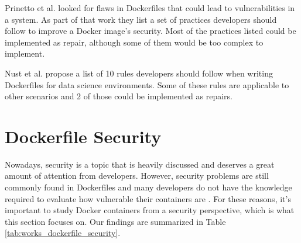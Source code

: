 Prinetto et al. \cite{prinettoSecurityMisconfigurationsDetection} looked for flaws in Dockerfiles that could lead to vulnerabilities in a system. As part of that work they list a set of practices developers should follow to improve a Docker image's security. Most of the practices listed could be implemented as repair, although some of them would be too complex to implement.

Nust et al. \cite{nustTenSimpleRules2020} propose a list of 10 rules developers should follow when writing Dockerfiles for data science environments. Some of these rules are applicable to other scenarios and 2 of those could be implemented as repairs.

\section{Dockerfile Security} \label{sec:dockerfile_security}

Nowadays, security is a topic that is heavily discussed and deserves a great amount of attention from developers. However, security problems are still commonly found in Dockerfiles \cite{doanDAVSDockerfileAnalysis2022} and many developers do not have the knowledge required to evaluate how vulnerable their containers are \cite{zareiInvestigatingInnerWorkings2022}. For these reasons, it's important to study Docker containers from a security perspective, which is what this section focuses on. Our findings are summarized in Table \ref{tab:works_dockerfile_security}.

